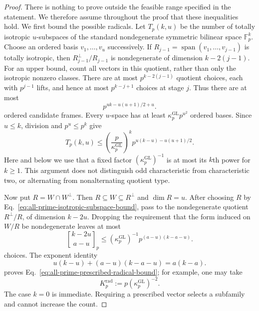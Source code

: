 \documentclass[11pt]{article}
\newcommand{\F}{\mathbb F}
\newcommand{\1}{\mathbf 1}
\theoremstyle{plain}
\theoremstyle{definition}
\theoremstyle{remark}
\begin{document}
\begin{proof}
There is nothing to prove outside the feasible range specified in the
statement.  We therefore assume throughout the proof that these inequalities
hold.  We first bound the possible radicals.  Let $T_p(k,u)$ be the number of
totally isotropic $u$-subspaces of the standard nondegenerate symmetric
bilinear space $\F_p^k$.  Choose an ordered basis
$v_1,\ldots,v_u$ successively.  If
$R_{j-1}=\operatorname{span}(v_1,\ldots,v_{j-1})$ is totally isotropic, then
$R_{j-1}^\perp/R_{j-1}$ is nondegenerate of dimension $k-2(j-1)$.
For an upper bound, count all vectors in this quotient, rather than only the
isotropic nonzero classes.  There are at most $p^{k-2(j-1)}$ quotient
choices, each with $p^{j-1}$ lifts, and hence at most $p^{k-j+1}$ choices at
stage $j$.  Thus there are at most
\begin{equation}
 p^{uk-u(u+1)/2+u}.
 \label{eq:all-prime-isotropic-ordered-frame-bound}
\end{equation}
ordered candidate frames.  Every $u$-space has at least
$\kappa_p^{\mathrm{GL}}p^{u^2}$ ordered bases.  Since $u\le k$, division
and $p^u\le p^k$ give
\begin{equation}
 T_p(k,u)\le
 \left(\frac{p}{\kappa_p^{\mathrm{GL}}}\right)^k
 p^{u(k-u)-u(u+1)/2}.
 \label{eq:all-prime-isotropic-subspace-bound}
\end{equation}
Here and below we use that a fixed factor
$(\kappa_p^{\mathrm{GL}})^{-1}$ is at most its $k$th power for $k\ge1$.  This argument does not distinguish
odd characteristic from characteristic two, or alternating from
nonalternating quotient type.

Now put $R=W\cap W^\perp$.  Then
$R\subseteq W\subseteq R^\perp$ and $\dim R=u$.  After choosing $R$ by
Eq.~\eqref{eq:all-prime-isotropic-subspace-bound}, pass to the nondegenerate
quotient $R^\perp/R$, of dimension $k-2u$.  Dropping the requirement that the
form induced on $W/R$ be nondegenerate leaves at most
\begin{equation}
 \genfrac{[}{]}{0pt}{}{k-2u}{a-u}_p
 \le (\kappa_p^{\mathrm{GL}})^{-1}
 p^{(a-u)(k-a-u)}.
 \label{eq:all-prime-radical-Gaussian-bound}
\end{equation}
choices.  The exponent identity
\begin{equation}
 u(k-u)+(a-u)(k-a-u)=a(k-a).
 \label{eq:all-prime-radical-exponent-identity}
\end{equation}
proves Eq.~\eqref{eq:all-prime-prescribed-radical-bound}; for example, one
may take
\begin{equation}
 K_p^{\mathrm{rad}}
 :=p(\kappa_p^{\mathrm{GL}})^{-2}.
 \label{eq:all-prime-radical-constant-choice}
\end{equation}
The case $k=0$ is immediate.  Requiring a prescribed vector selects a
subfamily and cannot increase the count.
\end{proof}
\end{document}
